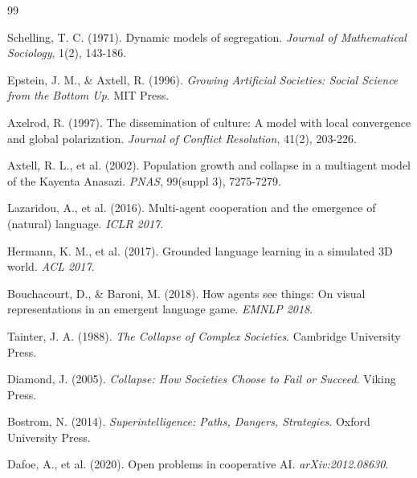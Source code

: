 \documentclass[11pt,a4paper]{article}
\begin{document}

\begin{thebibliography}{99}

Schelling, T. C. (1971). Dynamic models of segregation. \textit{Journal of Mathematical Sociology}, 1(2), 143-186.

Epstein, J. M., \& Axtell, R. (1996). \textit{Growing Artificial Societies: Social Science from the Bottom Up}. MIT Press.

Axelrod, R. (1997). The dissemination of culture: A model with local convergence and global polarization. \textit{Journal of Conflict Resolution}, 41(2), 203-226.

Axtell, R. L., et al. (2002). Population growth and collapse in a multiagent model of the Kayenta Anasazi. \textit{PNAS}, 99(suppl 3), 7275-7279.

Lazaridou, A., et al. (2016). Multi-agent cooperation and the emergence of (natural) language. \textit{ICLR 2017}.

Hermann, K. M., et al. (2017). Grounded language learning in a simulated 3D world. \textit{ACL 2017}.

Bouchacourt, D., \& Baroni, M. (2018). How agents see things: On visual representations in an emergent language game. \textit{EMNLP 2018}.

Tainter, J. A. (1988). \textit{The Collapse of Complex Societies}. Cambridge University Press.

Diamond, J. (2005). \textit{Collapse: How Societies Choose to Fail or Succeed}. Viking Press.

Bostrom, N. (2014). \textit{Superintelligence: Paths, Dangers, Strategies}. Oxford University Press.

Dafoe, A., et al. (2020). Open problems in cooperative AI. \textit{arXiv:2012.08630}.

\end{thebibliography}
\end{document}
